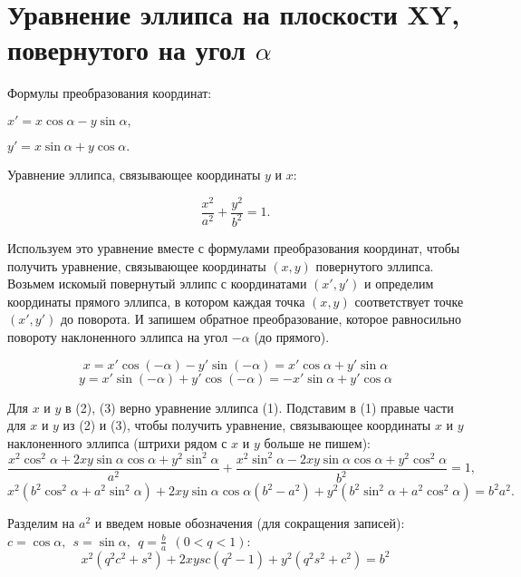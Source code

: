 \documentclass[14pt, a4paper]{article}
\begin{document}
\section{Уравнение эллипса на плоскости XY, повернутого на угол $\alpha$}


Формулы преобразования координат:

$
	x' = x \cos \alpha - y \sin \alpha,
$

$
	y' = x \sin \alpha + y \cos \alpha.
$

\noindent
Уравнение эллипса, связывающее координаты $y$ и $x$:

\begin{equation}
	\frac{x^2}{a^2} + \frac{y^2}{b^2} = 1.
\end{equation}

Используем это уравнение вместе с формулами преобразования координат, чтобы получить уравнение, связывающее координаты $(x,y)$ повернутого эллипса. Возьмем искомый повернутый эллипс с координатами $(x',y')$ и определим координаты прямого эллипса, в котором каждая точка $(x,y)$ соответствует точке $(x',y')$ до поворота. И запишем обратное преобразование, которое равносильно повороту наклоненного эллипса на угол $-\alpha$ (до прямого).

\begin{equation}
    x = x' \cos(-\alpha) - y' \sin(-\alpha) = x' \cos\alpha + y' \sin\alpha
\end{equation}
\begin{equation}
    y = x' \sin(-\alpha) + y' \cos(-\alpha) = -x' \sin\alpha + y' \cos\alpha
\end{equation}

Для $x$ и $y$ в (2), (3) верно уравнение эллипса (1). Подставим в (1) правые части для $x$ и $y$ из (2) и (3), чтобы получить уравнение, связывающее координаты $x$ и $y$ наклоненного эллипса (штрихи рядом с $x$ и $y$ больше не пишем):
$$
	\frac{x^2 \cos^2\alpha + 2xy\sin\alpha\cos\alpha + y^2\sin^2\alpha}{a^2} + \frac{x^2 \sin^2\alpha - 2xy\sin\alpha\cos\alpha + y^2\cos^2\alpha}{b^2} = 1,
$$
$$
	x^2(b^2\cos^2\alpha + a^2\sin^2\alpha) + 2xy\sin\alpha\cos\alpha(b^2-a^2) + y^2(b^2\sin^2\alpha + a^2\cos^2\alpha) = b^2a^2.
$$

Разделим на $a^2$ и введем новые обозначения (для сокращения записей): $c = \cos\alpha, \ \ s = \sin\alpha, \ \ q = \frac{b}{a} \ \ (0<q<1)$:
\begin{equation}
	x^2(q^2c^2 + s^2) + 2xysc(q^2-1) + y^2(q^2s^2+c^2) = b^2
\end{equation}
\end{document}
